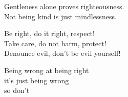 \begin{lyrics}
Gentleness alone proves righteousness.\\
Not being kind is just mindlessness.

Be right, do it right, respect!\\
Take care, do not harm, protect!\\
Denounce evil, don't be evil yourself!

Being wrong at being right\\
it's just being wrong\\
so don't
\end{lyrics}

